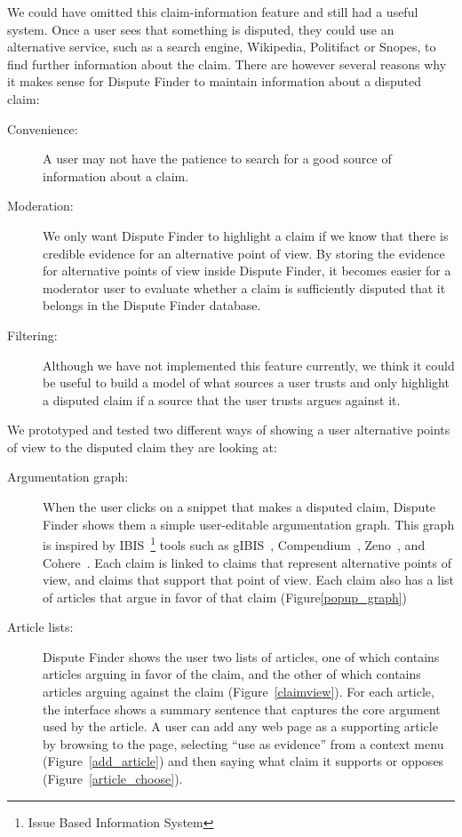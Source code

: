 \documentclass{www2010-submission}
\begin{document}
We could have omitted this claim-information feature and still had a useful system. Once a user sees that something is disputed, they could use an alternative service, such as a search engine, Wikipedia, Politifact or Snopes, to find further information about the claim. There are however several reasons why it makes sense for Dispute Finder to maintain information about a disputed claim:

\begin{description}
\item[Convenience:] A user may not have the patience to search for a good source of information about a claim. 
\item[Moderation:] We only want Dispute Finder to highlight a claim if we know that there is credible evidence for an alternative point of view. By storing the evidence for alternative points of view inside Dispute Finder, it becomes easier for a moderator user to evaluate whether a claim is sufficiently disputed that it belongs in the Dispute Finder database.
\item[Filtering:] Although we have not implemented this feature currently, we think it could be useful to build a model of what sources a user trusts and only highlight a disputed claim if a source that the user trusts argues against it.
\end{description}


We prototyped and tested two different ways of showing a user alternative points of view to the disputed claim they are looking at:

\begin{description}
\item[Argumentation graph:] When the user clicks on a snippet that makes a disputed claim, Dispute Finder shows them a simple user-editable argumentation graph. This graph is inspired by IBIS~\footnote{Issue Based Information System} tools such as gIBIS~\cite{Conklin1987a}, Compendium~\cite{Selvin2001}, Zeno~\cite{Gordon1997}, and Cohere~\cite{Shum2008}. Each claim is linked to claims that represent alternative points of view, and claims that support that point of view. Each claim also has a list of articles that argue in favor of that claim (Figure\ref{popup_graph})

\item[Article lists:] Dispute Finder shows the user two lists of articles, one of which contains articles arguing in favor of the claim, and the other of which contains articles arguing against the claim (Figure~\ref{claimview}). For each article, the interface shows a summary sentence that captures the core argument used by the article. A user can add any web page as a supporting article by browsing to the page, selecting ``use as evidence'' from a context menu (Figure~\ref{add_article}) and then saying what claim it supports or opposes (Figure~\ref{article_choose}).
\end{description}
\end{document}

